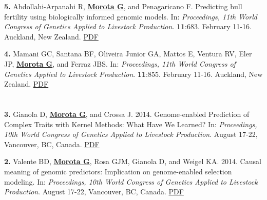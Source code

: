 \documentclass[margin,line,10pt]{res}
\newenvironment{list1}{
  \begin{list}{\ding{113}}{%
      \setlength{\itemsep}{0in}
      \setlength{\parsep}{0in} \setlength{\parskip}{0in}
      \setlength{\topsep}{0in} \setlength{\partopsep}{0in} 
      \setlength{\leftmargin}{0.17in}}}{\end{list}}
\begin{document}
\begin{resume}
\begin{list1}
\vspace{0.5cm}

\item [\bf{5}.] Abdollahi-Arpanahi R, {\bf \underline{Morota G}}, and Penagaricano F. Predicting bull fertility using biologically informed genomic models.  In: \emph{Proceedings, 11th World Congress of Genetics Applied to Livestock Production}. \textbf{11}:683. February 11-16. Auckland, New Zealand. \textcolor{blue}{\href{http://www.wcgalp.org/proceedings/2018/predicting-bull-fertility-using-biologically-informed-genomic-models}{PDF}}

  \vspace{0.5cm}
  
\item [\bf{4}.] Mamani GC, Santana BF, Oliveira Junior GA, Mattos E, Ventura RV, Eler JP, {\bf \underline{Morota G}}, and Ferraz JBS. In: \emph{Proceedings, 11th World Congress of Genetics Applied to Livestock Production}. \textbf{11}:855. February 11-16. Auckland, New Zealand. \textcolor{blue}{\href{http://www.wcgalp.org/proceedings/2018/effect-inbreeding-productive-traits-nellore-cattle}{PDF}} 

  
\end{list1}

\section{}
\begin{list1}
\item [\bf{3}.] Gianola D, {\bf \underline{Morota G}}, and Crossa J. 2014. 
Genome-enabled Prediction of Complex Traits with Kernel Methods: What Have We Learned? In: \emph{Proceedings, 10th World Congress of Genetics Applied to Livestock Production}. August 17-22, Vancouver, BC, Canada. 
\textcolor{blue}{\href{http://www.morotalab.org/publications/pdf/gianola2014WCGALP.pdf}{PDF}}  


\vspace{0.5cm}

\item [\bf{2}.] Valente BD, {\bf \underline{Morota G}}, Rosa GJM, Gianola D, and  Weigel KA. 2014. 
Causal meaning of genomic predictors: Implication on genome-enabled selection modeling. In: \emph{Proceedings, 10th World Congress of Genetics Applied to Livestock Production}. August 17-22, Vancouver, BC, Canada. 
\textcolor{blue}{\href{http://www.morotalab.org/publications/pdf/valente2014WCGALP.pdf}{PDF}}
\end{list1}



\end{resume}
\end{document}
